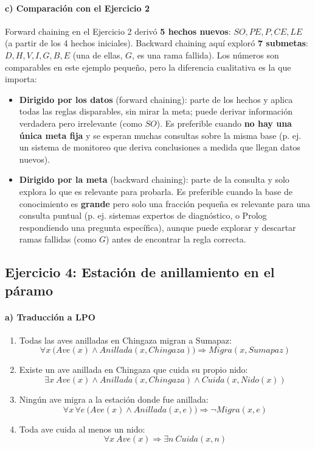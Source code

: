 \paragraph{c) Comparación con el Ejercicio 2}
Forward chaining en el Ejercicio 2 derivó \textbf{5 hechos nuevos}: $SO, PE, P, CE, LE$ (a partir de
los 4 hechos iniciales). Backward chaining aquí exploró \textbf{7 submetas}: $D, H, V, I, G, B, E$
(una de ellas, $G$, es una rama fallida). Los números son comparables en este ejemplo pequeño, pero
la diferencia cualitativa es la que importa:
\begin{itemize}
    \item \textbf{Dirigido por los datos} (forward chaining): parte de los hechos y aplica todas las
    reglas disparables, sin mirar la meta; puede derivar información verdadera pero irrelevante
    (como $SO$). Es preferible cuando \textbf{no hay una única meta fija} y se esperan muchas
    consultas sobre la misma base (p. ej. un sistema de monitoreo que deriva conclusiones a medida
    que llegan datos nuevos).
    \item \textbf{Dirigido por la meta} (backward chaining): parte de la consulta y solo explora lo
    que es relevante para probarla. Es preferible cuando la base de conocimiento es \textbf{grande}
    pero solo una fracción pequeña es relevante para una consulta puntual (p. ej. sistemas expertos de
    diagnóstico, o Prolog respondiendo una pregunta específica), aunque puede explorar y descartar
    ramas fallidas (como $G$) antes de encontrar la regla correcta.
\end{itemize}

\subsection{Ejercicio 4: Estación de anillamiento en el páramo}

\paragraph{a) Traducción a LPO}

\begin{enumerate}
    \item[a.1.] Todas las aves anilladas en Chingaza migran a Sumapaz:
    \[
        \forall x\ \big(Ave(x)\land Anillada(x,Chingaza)\big) \Rightarrow Migra(x,Sumapaz)
    \]
    \item[a.2.] Existe un ave anillada en Chingaza que cuida su propio nido:
    \[
        \exists x\ Ave(x)\land Anillada(x,Chingaza)\land Cuida(x,Nido(x))
    \]
    \item[a.3.] Ningún ave migra a la estación donde fue anillada:
    \[
        \forall x\,\forall e\ \big(Ave(x)\land Anillada(x,e)\big) \Rightarrow \neg Migra(x,e)
    \]
    \item[a.4.] Toda ave cuida al menos un nido:
    \[
        \forall x\ Ave(x) \Rightarrow \exists n\ Cuida(x,n)
    \]
\end{enumerate}

